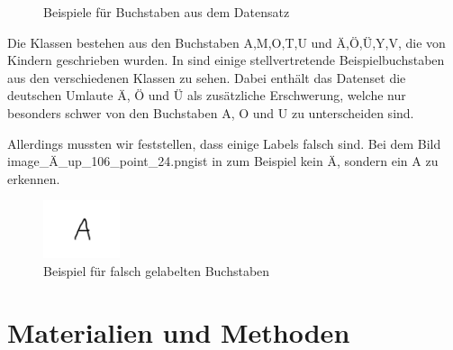 \documentclass[runningheads,a4paper]{llncs}[2015/06/24]
\begin{document}
\begin{figure}
	\caption{Beispiele für Buchstaben aus dem Datensatz}
	\label{fig:charexample}
\end{figure}
Die Klassen bestehen aus den Buchstaben A,M,O,T,U und Ä,Ö,Ü,Y,V, die von Kindern geschrieben wurden. In  sind einige stellvertretende Beispielbuchstaben aus den verschiedenen Klassen zu sehen.
Dabei enthält das Datenset die deutschen Umlaute \"{A}, \"{O} und \"{U} als zusätzliche Erschwerung, welche nur besonders schwer von den Buchstaben A, O und U zu unterscheiden sind.

Allerdings mussten wir feststellen, dass einige Labels falsch sind. Bei dem Bild \glqq image\_Ä\_up\_106\_point\_24.png\grqq   ist in  zum Beispiel kein Ä, sondern ein A zu erkennen.

\begin{figure}
	\centering
	\includegraphics[width=0.2\textwidth]{hand_images/image_Ae_up_106_point_24.png}
	
	\caption{Beispiel für falsch gelabelten Buchstaben}
	\label{fig:wrongchar}
\end{figure}

\section{Materialien und Methoden}\label{sec:material}
\end{document}
